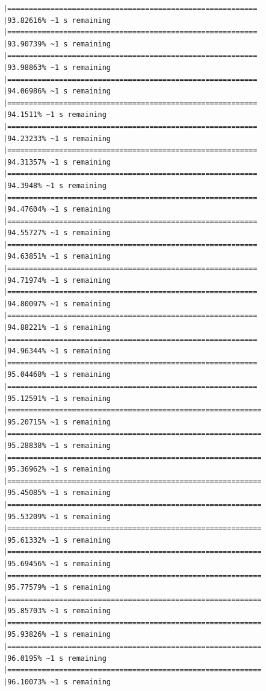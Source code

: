 \documentclass{article}\usepackage[]{graphicx}\usepackage[]{xcolor}
\makeatletter
\newenvironment{kframe}{%
 \def\at@end@of@kframe{}%
 \ifinner\ifhmode%
  \def\at@end@of@kframe{\end{minipage}}%
  \begin{minipage}{\columnwidth}%
 \fi\fi%
 \def\FrameCommand##1{\hskip\@totalleftmargin \hskip-\fboxsep
 \colorbox{shadecolor}{##1}\hskip-\fboxsep
     \hskip-\linewidth \hskip-\@totalleftmargin \hskip\columnwidth}%
 \MakeFramed {\advance\hsize-\width
   \@totalleftmargin\z@ \linewidth\hsize
   \@setminipage}}%
 {\par\unskip\endMakeFramed%
 \at@end@of@kframe}
\newenvironment{knitrout}{}{} %
\makeatother
\begin{document}
\begin{knitrout}
\begin{kframe}
\begin{verbatim}
|==========================================================    |93.82616% ~1 s remaining  
|==========================================================    |93.90739% ~1 s remaining  
|==========================================================    |93.98863% ~1 s remaining  
|==========================================================    |94.06986% ~1 s remaining  
|==========================================================    |94.1511% ~1 s remaining   
|==========================================================    |94.23233% ~1 s remaining  
|==========================================================    |94.31357% ~1 s remaining  
|==========================================================    |94.3948% ~1 s remaining   
|==========================================================    |94.47604% ~1 s remaining  
|==========================================================    |94.55727% ~1 s remaining  
|==========================================================    |94.63851% ~1 s remaining  
|==========================================================    |94.71974% ~1 s remaining  
|==========================================================    |94.80097% ~1 s remaining  
|==========================================================    |94.88221% ~1 s remaining  
|==========================================================    |94.96344% ~1 s remaining  
|==========================================================    |95.04468% ~1 s remaining  
|==========================================================    |95.12591% ~1 s remaining  
|===========================================================   |95.20715% ~1 s remaining  
|===========================================================   |95.28838% ~1 s remaining  
|===========================================================   |95.36962% ~1 s remaining  
|===========================================================   |95.45085% ~1 s remaining  
|===========================================================   |95.53209% ~1 s remaining  
|===========================================================   |95.61332% ~1 s remaining  
|===========================================================   |95.69456% ~1 s remaining  
|===========================================================   |95.77579% ~1 s remaining  
|===========================================================   |95.85703% ~1 s remaining  
|===========================================================   |95.93826% ~1 s remaining  
|===========================================================   |96.0195% ~1 s remaining   
|===========================================================   |96.10073% ~1 s remaining  

\end{verbatim}
\end{kframe}
\end{knitrout}
\end{document}
